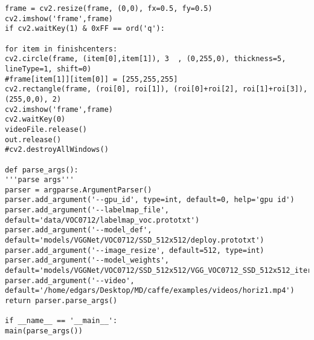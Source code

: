 \documentclass[12pt,paper=a4]{report}
\begin{document}
\begin{lstlisting}
frame = cv2.resize(frame, (0,0), fx=0.5, fy=0.5)
cv2.imshow('frame',frame)
if cv2.waitKey(1) & 0xFF == ord('q'):

for item in finishcenters:
cv2.circle(frame, (item[0],item[1]), 3  , (0,255,0), thickness=5, lineType=1, shift=0)
#frame[item[1]][item[0]] = [255,255,255]
cv2.rectangle(frame, (roi[0], roi[1]), (roi[0]+roi[2], roi[1]+roi[3]), (255,0,0), 2)
cv2.imshow('frame',frame)
cv2.waitKey(0)
videoFile.release()
out.release()
#cv2.destroyAllWindows()

def parse_args():
'''parse args'''
parser = argparse.ArgumentParser()
parser.add_argument('--gpu_id', type=int, default=0, help='gpu id')
parser.add_argument('--labelmap_file',
default='data/VOC0712/labelmap_voc.prototxt')
parser.add_argument('--model_def',
default='models/VGGNet/VOC0712/SSD_512x512/deploy.prototxt')
parser.add_argument('--image_resize', default=512, type=int)
parser.add_argument('--model_weights',
default='models/VGGNet/VOC0712/SSD_512x512/VGG_VOC0712_SSD_512x512_iter_124340.caffemodel')
parser.add_argument('--video', default='/home/edgars/Desktop/MD/caffe/examples/videos/horiz1.mp4')
return parser.parse_args()

if __name__ == '__main__':
main(parse_args())

\end{lstlisting}
\end{document}
